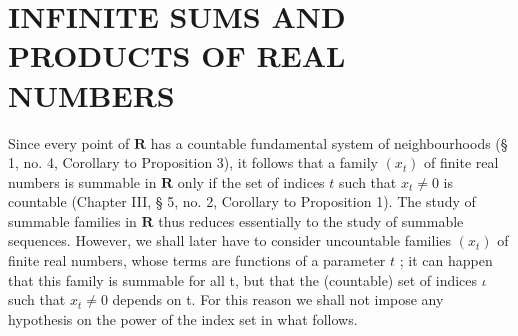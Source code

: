 \section{INFINITE SUMS AND PRODUCTS OF REAL NUMBERS}

Since every point of \(\mathbf{R}\) has a countable fundamental system of neighbourhoods (§ 1, no. 4, Corollary to Proposition 3), it follows that a family \((x_{t})\) of finite real numbers is summable in \(\mathbf{R}\) only if the set of indices \(t\) such that \(x_{t} \neq 0\) is countable (Chapter III, § 5, no. 2, Corollary to Proposition 1). The study of summable families in \(\mathbf{R}\) thus reduces essentially to the study of summable sequences. However, we shall later have to consider uncountable families \((x_{t})\) of finite real numbers, whose terms are functions of a parameter \(t\) ; it can happen that this family is summable for all t, but that the (countable) set of indices \(\iota\) such that \(x_{t} \neq 0\) depends on t. For this reason we shall not impose any hypothesis on the power of the index set in what follows.

